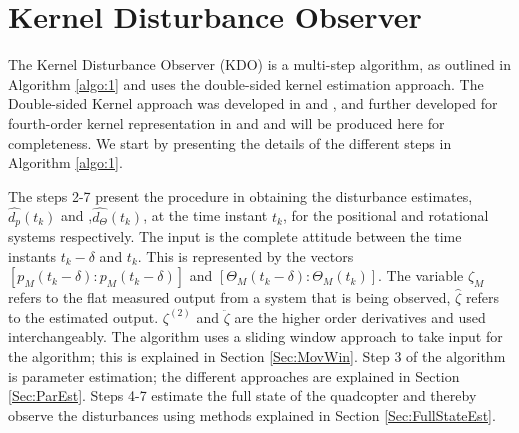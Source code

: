 \documentclass[letterpaper%
, twoside%
, 12pt%
,memoire%
, english%
,creativecommons,hyperref%
]{thETS}
\begin{document}
\chapter{Kernel Disturbance Observer} \label{Chap:KDO}
The Kernel Disturbance Observer (KDO) is a multi-step algorithm, as outlined in Algorithm \ref{algo:1} and uses the double-sided kernel estimation approach. The Double-sided Kernel approach was developed in \citep{RN119} and \citep{RN76}, and further developed for fourth-order kernel representation in \citep{RN83} and \citep{RN120} and will be produced here for completeness. We start by presenting the details of the different steps in Algorithm \ref{algo:1}. 

The steps 2-7 present the procedure in obtaining the disturbance estimates, $\hat{d_p}(t_k)$ and ,$\hat{d_\Theta}(t_k)$, at the time instant $t_k$, for the positional and rotational systems respectively. The input is the complete attitude between the time instants $t_k-\delta$ and $t_k$. This is represented by the vectors $[p_M(t_k-\delta) : p_{M}(t_k-\delta)]$ and $[\Theta_M(t_k-\delta) : \Theta_M(t_k)]$. The variable $\zeta_M$ refers to the flat measured output from a system that is being observed, $\hat{\zeta}$ refers to the estimated output. ${\zeta}^{(2)}$ and $\ddot{\zeta}$ are the higher order derivatives and used interchangeably. The algorithm uses a sliding window approach to take input for the algorithm; this is explained in Section \ref{Sec:MovWin}. Step 3 of the algorithm is parameter estimation; the different approaches are explained in Section \ref{Sec:ParEst}. Steps 4-7 estimate the full state of the quadcopter and thereby observe the disturbances using methods explained in Section \ref{Sec:FullStateEst}.
\end{document}
